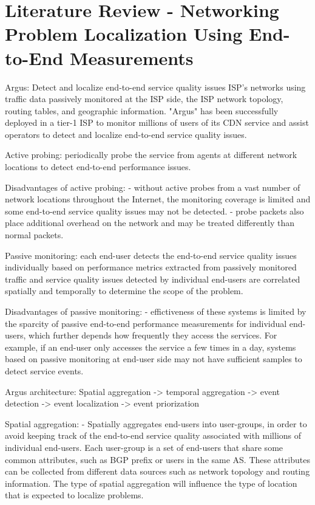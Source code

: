 \chapter{Literature Review - Networking Problem Localization Using End-to-End
Measurements}

Argus:
Detect and localize end-to-end service quality issues ISP's networks using
traffic data passively monitored at the ISP side, the ISP network topology,
routing tables, and geographic information. "Argus" has been successfully
deployed in a tier-1 ISP to monitor millions of users of its CDN service and
assist operators to detect and localize end-to-end service quality issues.

Active probing: periodically probe the service from agents at different network
locations to detect end-to-end performance issues.

Disadvantages of active probing:
- without active probes from a vast number of network locations throughout the
Internet, the monitoring coverage is limited and some end-to-end service
quality issues may not be detected.
- probe packets also place additional overhead on the network and may be
treated differently than normal packets.

Passive monitoring: each end-user detects the end-to-end service quality issues
individually based on performance metrics extracted from passively monitored
traffic and service quality issues detected by individual end-users are
correlated spatially and temporally to determine the scope of the problem.

Disadvantages of passive monitoring:
- effictiveness of these systems is limited by the sparcity of passive
end-to-end performance measurements for individual end-users, which further
depends how frequently they access the services. For example, if an end-user
only accesses the service a few times in a day, systems based on passive
monitoring at end-user side may not have sufficient samples to detect service
events.

Argus architecture:
Spatial aggregation -> temporal aggregation -> event detection -> event
localization -> event priorization

Spatial aggregation:
- Spatially aggregates end-users into user-groups, in order to avoid keeping
track of the end-to-end service quality associated with millions of individual
end-users. Each user-group is a set of end-users that share some common
attributes, such as BGP prefix or users in the same AS. These attributes can be
collected from different data sources such as network topology and routing
information. The type of spatial aggregation will influence the type of
location that is expected to localize problems.

